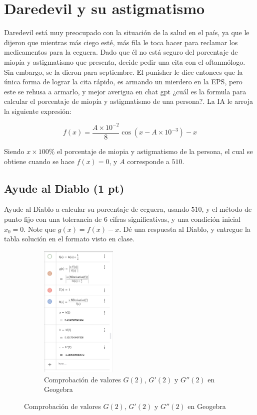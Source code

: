 \section{Daredevil y su astigmatismo}

Daredevil está muy preocupado con la situación de la salud en el país, ya que le dijeron que mientras más ciego esté,  más fila le toca hacer para reclamar los medicamentos para la ceguera. Dado que él no está seguro del porcentaje de miopía y astigmatismo que presenta, decide pedir una cita con el oftanmólogo. Sin embargo, se la dieron para septiembre. El punisher le dice entonces que la única forma de lograr la cita rápido, es armando un mierdero en la EPS, pero este se rehusa a armarlo, y mejor averigua en chat gpt ¿cuál es la formula para calcular el porcentaje de miopía y astigmatismo de una persona?. La IA le arroja la siguiente expresión:

\[ f(x) = \frac{A\times10^{-2}}{8} \cos \left(x - A\times10^{-3} \right) - x \]

Siendo $x \times 100\%$ el porcentaje de miopia y astigmatismo de la persona,
el cual se obtiene cuando se hace $f(x) = 0$, y $A$ corresponde a $510$.


\subsection{Ayude al Diablo (1 pt)}

Ayude  al Diablo a calcular su porcentaje de ceguera, usando $510$, y el
método de punto fijo con una tolerancia de 6 cifras significativas, y una
condición inicial $x_0 = 0$. Note que $g(x) = f(x) - x$.
Dé una respuesta al Diablo, y entregue la tabla solución en el formato visto en clase.

\begin{figure}[H]
    \centering
    \begin{subfigure}[b]{\textwidth}
        \centering
        \includegraphics[width=0.4\textwidth]{Figures/0. General/1.2.png}
        \caption{Comprobación de valores $G(2)$, $G'(2)$ y $G''(2)$ en Geogebra}
        \label{fig: Comprobacion en Geogebra}
    \end{subfigure}
\end{figure}
